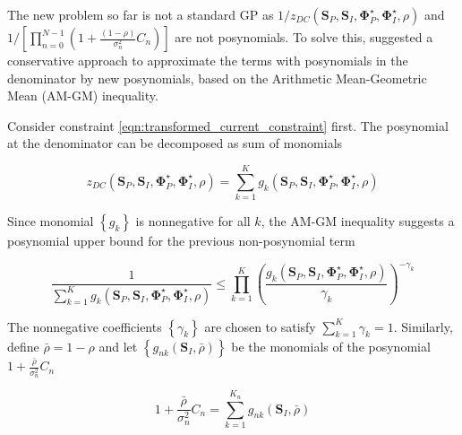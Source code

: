 The new problem so far is not a standard GP as $1/{z_{DC}}\left( {{{\mathbf{S}}_P},{{\mathbf{S}}_I},{\mathbf{\Phi }}_P^ \star ,{\mathbf{\Phi }}_I^ \star ,\rho } \right)$ and $1/\left[ {\prod\nolimits_{n = 0}^{N - 1} {\left( {1 + \frac{{(1 - \rho )}}{{\sigma _n^2}}{C_n}} \right)} } \right]$ are not posynomials. To solve this, \cite{Clerckx2018} suggested a conservative approach to approximate the terms with posynomials in the denominator by new posynomials, based on the Arithmetic Mean-Geometric Mean (AM-GM) inequality.

Consider constraint \ref{eqn:transformed_current_constraint} first. The posynomial at the denominator can be decomposed as sum of monomials

\begin{equation}\label{eqn:transformed_current_posynomial_decomposition}
  {z_{DC}}\left( {{{\mathbf{S}}_P},{{\mathbf{S}}_I},{\mathbf{\Phi }}_P^ \star ,{\mathbf{\Phi }}_I^ \star ,\rho } \right) = \sum\limits_{k = 1}^K {{g_k}\left( {{{\mathbf{S}}_P},{{\mathbf{S}}_I},{\mathbf{\Phi }}_P^ \star ,{\mathbf{\Phi }}_I^ \star ,\rho } \right)}
\end{equation}

Since monomial $\left\{ {{g_k}} \right\}$ is nonnegative for all $k$, the AM-GM inequality suggests a posynomial upper bound for the previous non-posynomial term

\begin{equation}\label{eqn:transformed_current_am_gm}
  \frac{1}{{\sum\limits_{k = 1}^K {{g_k}\left( {{{\mathbf{S}}_P},{{\mathbf{S}}_I},{\mathbf{\Phi }}_P^ \star ,{\mathbf{\Phi }}_I^ \star ,\rho } \right)} }} \leqslant \prod\limits_{k = 1}^K {{{\left( {\frac{{{g_k}\left( {{{\mathbf{S}}_P},{{\mathbf{S}}_I},{\mathbf{\Phi }}_P^ \star ,{\mathbf{\Phi }}_I^ \star ,\rho } \right)}}{{{\gamma _k}}}} \right)}^{ - {\gamma _k}}}}
\end{equation}

The nonnegative coefficients $\left\{ {{\gamma _k}} \right\}$ are chosen to satisfy $\sum\nolimits_{k = 1}^K {{\gamma _k}}  = 1$. Similarly, define $\bar \rho  = 1 - \rho $ and let $\left\{ {{g_{nk}}\left( {{{\mathbf{S}}_I},\bar \rho } \right)} \right\}$ be the monomials of the posynomial $1 + \frac{{\bar \rho }}{{\sigma _n^2}}{C_n}$

\begin{equation}\label{eqn:transformed_rate_posynomial_decomposition}
  1 + \frac{{\bar \rho }}{{\sigma _n^2}}{C_n} = \sum\limits_{k = 1}^{{K_n}} {{g_{nk}}} \left( {{{\mathbf{S}}_I},\bar \rho } \right)
\end{equation}


